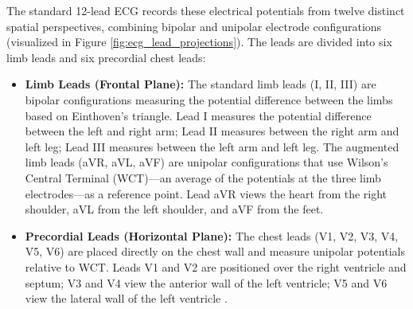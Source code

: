 \documentclass[12pt,a4paper]{report}
\begin{document}
The standard 12-lead ECG records these electrical potentials from twelve distinct spatial perspectives, combining bipolar and unipolar electrode configurations (visualized in Figure \ref{fig:ecg_lead_projections}). The leads are divided into six limb leads and six precordial chest leads:
\begin{itemize}
    \item \textbf{Limb Leads (Frontal Plane):} The standard limb leads (I, II, III) are bipolar configurations measuring the potential difference between the limbs based on Einthoven's triangle. Lead I measures the potential difference between the left and right arm; Lead II measures between the right arm and left leg; Lead III measures between the left arm and left leg. The augmented limb leads (aVR, aVL, aVF) are unipolar configurations that use Wilson's Central Terminal (WCT)---an average of the potentials at the three limb electrodes---as a reference point. Lead aVR views the heart from the right shoulder, aVL from the left shoulder, and aVF from the feet.
    \item \textbf{Precordial Leads (Horizontal Plane):} The chest leads (V1, V2, V3, V4, V5, V6) are placed directly on the chest wall and measure unipolar potentials relative to WCT. Leads V1 and V2 are positioned over the right ventricle and septum; V3 and V4 view the anterior wall of the left ventricle; V5 and V6 view the lateral wall of the left ventricle \cite{schlapfer2017ecg}.
\end{itemize}
\end{document}
